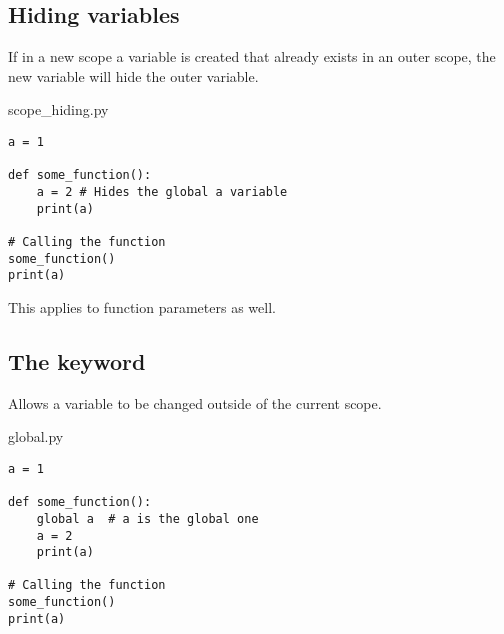 \documentclass[aspectratio=1610,slidestop]{beamer}
\begin{document}
\subsection{Hiding variables}
\begin{pframe}
 If in a new scope a variable is created that already exists in an outer scope,
 the new variable will hide the outer variable.
 \pause
 \medskip

 \begin{minipage}[t]{0.60\textwidth}
  \begin{pythonfile}{scope\_hiding.py}
   \begin{verbatim}
a = 1

def some_function():
    a = 2 # Hides the global a variable
    print(a)

# Calling the function
some_function()
print(a)
   \end{verbatim}
  \end{pythonfile}
 \end{minipage}\qquad
 \pause
 \begin{minipage}[t]{0.35\textwidth}
 \vspace{-4.55cm}
 \begin{terminal}
  \end{terminal}
 \end{minipage}
 \pause
 \smallskip

  This applies to function parameters as well.
\end{pframe}


\subsection{The  keyword}
\begin{pframe}
 Allows a variable to be changed outside of the current scope.
 \pause
 \medskip

 \begin{minipage}[t]{0.60\textwidth}
  \begin{pythonfile}{global.py}
   \begin{verbatim}
a = 1

def some_function():
    global a  # a is the global one
    a = 2
    print(a)

# Calling the function
some_function()
print(a)
   \end{verbatim}
  \end{pythonfile}
 \end{minipage}\qquad
 \pause
 \begin{minipage}[t]{0.35\textwidth}
 \vspace{-4.95cm}
 \begin{terminal}
  \end{terminal}
 \end{minipage}
\end{pframe}
\end{document}
